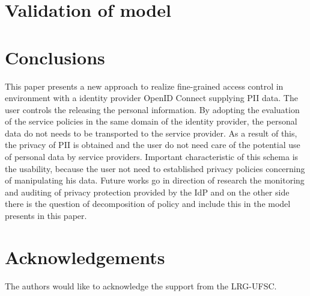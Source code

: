 \documentclass{doublecol-new}
\begin{document}
\section{Validation of model}



\section{Conclusions}


This paper presents a new approach to realize fine-grained access control in environment with a identity provider OpenID Connect supplying PII data. The user controls the releasing the personal information. By adopting the evaluation of the service policies in the same domain of the identity provider, the personal data do not needs to be transported to the service provider. As a result of this, the privacy of PII is obtained and the user do not need care of the potential use of personal data by service providers. Important characteristic of this schema is the usability, because the user not need to established privacy policies concerning of manipulating his data.
Future works go in direction of research the monitoring and auditing of privacy protection provided by the IdP and on the other side there is the question of decomposition of policy and include this in the model presents in this paper.


\section*{Acknowledgements}
The authors would like to acknowledge the support from the LRG-UFSC.



\end{document}
